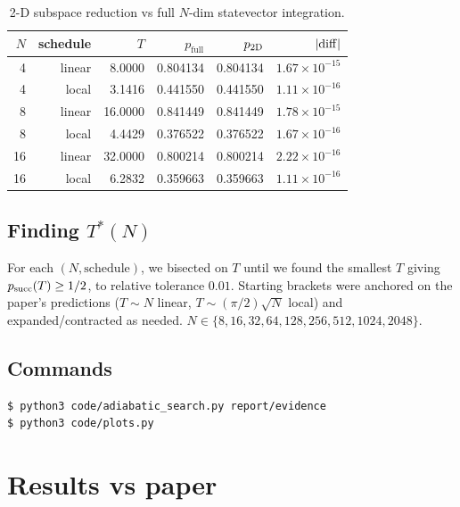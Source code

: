 \documentclass[11pt]{article}
\begin{document}
\begin{table}[h]\centering\small
\begin{tabular}{rrrrrr}
\toprule
$N$ & schedule & $T$ & $p_{\text{full}}$ & $p_{\rm 2D}$ & $|{\rm diff}|$ \\
\midrule
 4 & linear &  8.0000 & 0.804134 & 0.804134 & $1.67\times 10^{-15}$ \\
 4 & local  &  3.1416 & 0.441550 & 0.441550 & $1.11\times 10^{-16}$ \\
 8 & linear & 16.0000 & 0.841449 & 0.841449 & $1.78\times 10^{-15}$ \\
 8 & local  &  4.4429 & 0.376522 & 0.376522 & $1.67\times 10^{-16}$ \\
16 & linear & 32.0000 & 0.800214 & 0.800214 & $2.22\times 10^{-16}$ \\
16 & local  &  6.2832 & 0.359663 & 0.359663 & $1.11\times 10^{-16}$ \\
\bottomrule
\end{tabular}
\caption{2-D subspace reduction vs full $N$-dim statevector integration.}
\label{tab:sanity}
\end{table}

\subsection{Finding $T^{\ast}(N)$}
For each $(N,\text{schedule})$, we bisected on $T$ until we found the smallest
$T$ giving $p_{\rm succ}(T)\ge 1/2$, to relative tolerance $0.01$.
Starting brackets were anchored on the paper's predictions ($T\sim N$ linear,
$T\sim(\pi/2)\sqrt N$ local) and expanded/contracted as needed.
$N\in\{8,16,32,64,128,256,512,1024,2048\}$.

\subsection{Commands}
\begin{lstlisting}
$ python3 code/adiabatic_search.py report/evidence
$ python3 code/plots.py
\end{lstlisting}

\section{Results vs paper}
\end{document}
